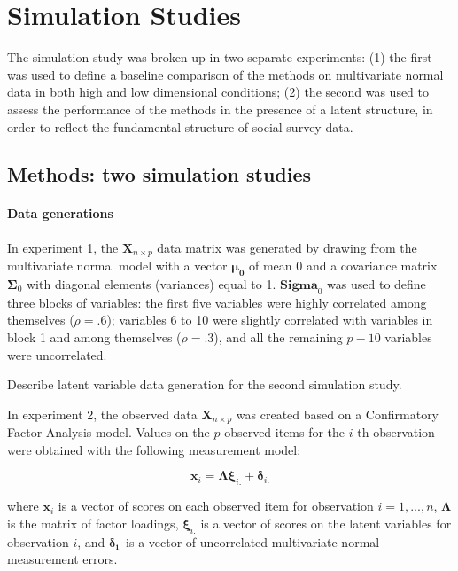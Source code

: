 \maketitle
\section{Simulation Studies}

The simulation study was broken up in two separate experiments: (1) the first was used to define a baseline comparison 
of the methods on multivariate normal data in both high and low dimensional conditions; (2) the second was used to 
assess the performance of the methods in the presence of a latent structure, in order to reflect the fundamental
structure of social survey data.

\subsection{Methods: two simulation studies}

\paragraph{Data generations}

	In experiment 1, the $\bm{X}_{n \times p}$ data matrix was generated by drawing from the multivariate normal 
	model with a vector $\bm{\mu_0}$ of mean 0 and a covariance matrix $\bm{\Sigma}_0$ with diagonal 
	elements (variances) equal to 1. $\bm{Sigma}_0$ was used to define three blocks of variables: the 
	first five variables were highly correlated among themselves ($\rho = .6$); variables 6 to 10
	were slightly correlated with variables in block 1 and among themselves ($\rho = .3$), and all 
	the remaining $p-10$ variables were uncorrelated.

	Describe latent variable data generation for the second simulation study.

	In experiment 2, the observed data $\bm{X}_{n \times p}$ was created based on a Confirmatory
	Factor Analysis model. Values on the $p$ observed items for the $i$-th observation were obtained
	with the following measurement model:

	\begin{equation}
		\bm{x}_i = \bm{\Lambda} \bm{\xi}_{i.} + \bm{\delta}_{i.}
	\end{equation}

	where $\bm{x}_i$ is a vector of scores on each observed item for observation $i = 1, ..., n$,
	$\bm{\Lambda}$ is the matrix of factor loadings, $\bm{\xi}_{i.}$ is a vector of scores on the
	latent variables for observation $i$, and $\bm{\delta_{i.}}$ is a vector of uncorrelated multivariate 
	normal measurement errors.

